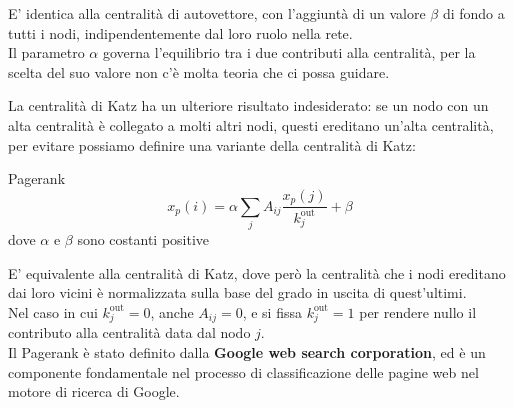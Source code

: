 E' identica alla centralità di autovettore, con l'aggiuntà di un valore $\beta$ di fondo a tutti i nodi, indipendentemente dal loro ruolo nella rete. \\
Il parametro $\alpha$ governa l'equilibrio tra i due contributi alla centralità, per la scelta del suo valore non c'è molta teoria che ci possa guidare.

La centralità di Katz ha un ulteriore risultato indesiderato: se un nodo con un alta centralità è collegato a molti altri nodi, questi ereditano un'alta centralità, per evitare possiamo definire una variante della centralità di Katz:
\begin{boxb}{Pagerank}
\begin{equation}
  x_p(i)=\alpha \sum_{j}^{}A_{ij} \frac{x_p(j)}{k_j^{\text{out}}}+ \beta
\end{equation}
  dove $\alpha$ e $\beta$ sono costanti positive
\end{boxb}
E' equivalente alla centralità di Katz, dove però la centralità che i nodi ereditano dai loro vicini è normalizzata sulla base del grado in uscita di quest'ultimi.\\
Nel caso in cui $k_j^{\text{out}}=0$, anche $A_{ij}=0$, e si fissa $k_j^{\text{out}}=1$ per rendere nullo il contributo alla centralità data dal nodo $j$.\\


Il Pagerank è stato definito dalla \textbf{Google web search corporation}, ed è un componente fondamentale nel processo di classificazione delle pagine web nel motore di ricerca di Google.\\

